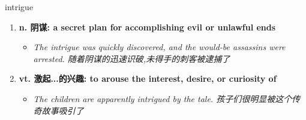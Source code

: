 
\begin{frame}
{\huge intrigue}
\begin{center}
\begin{enumerate}\Large
  \item \textbf{n. 阴谋: a secret plan for accomplishing evil or unlawful ends}
  \begin{itemize}
    \item \em{\Large{The intrigue was quickly discovered, and the would-be assassins were arrested. 随着阴谋的迅速识破,未得手的刺客被逮捕了}}
  \end{itemize}
  \item \textbf{vt. 激起...的兴趣: to arouse the interest, desire, or curiosity of}
  \begin{itemize}
    \item \em{\Large{The children are apparently intrigued by the tale. 孩子们很明显被这个传奇故事吸引了}}
  \end{itemize}
\end{enumerate}
\end{center}
\end{frame}
